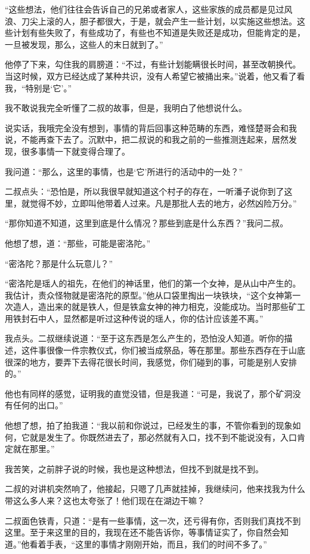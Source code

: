 “这些想法，他们往往会告诉自己的兄弟或者家人，这些家族的成员都是见过风浪、刀尖上滚的人，胆子都很大，于是，就会产生一些计划，以实施这些想法。这些计划有些失败了，有些成功了，有些也不知道是失败还是成功，但能肯定的是，一旦被发现，那么，这些人的末日就到了。”

他停了下来，勾住我的肩膀道：“不过，有些计划能瞒很长时间，甚至改朝换代。当这时候，双方已经达成了某种共识，没有人希望它被捅出来。”说着，他又看了看我，“特别是‘它’。”

我不敢说我完全听懂了二叔的故事，但是，我明白了他想说什么。

说实话，我哦完全没有想到，事情的背后回事这种范畴的东西，难怪楚哥会和我说，不能再查下去了。沉默中，把二叔说的和我之前的一些推测连起来，居然发现，很多事情一下就变得合理了。

我问道：“那么，这里的事情，也是‘它’所进行的活动中的一处？”

二叔点头：“恐怕是，所以我很早就知道这个村子的存在，一听潘子说你到了这里，就觉得不妙，立即叫他带着人过来。凡是那批人去的地方，必然凶险万分。”

“那你知道不知道，这里到底是什么情况？那些到底是什么东西？”我问二叔。

他想了想，道：“那些，可能是密洛陀。”

“密洛陀？那是什么玩意儿？”

“密洛陀是瑶人的祖先，在他们的神话里，他们的第一个女神，是从山中产生的。我估计，责众怪物就是密洛陀的原型。”他从口袋里掏出一块铁块，“这个女神第一次造人，造出来的就是铁人，但是铁盒女神的神力相克，没能成功。当时那些矿工用铁封石中人，显然都是听过这种传说的瑶人，你的估计应该差不离。”

我点头。二叔继续说道：“至于这东西是怎么产生的，恐怕没人知道。听你的描述，这件事很像一件宗教仪式，你们被当成祭品，等在那里。那些东西存在于山底很深的地方，要弄下去得花很长时间，我感觉，你们碰到的事，可能是别人安排的。”

他也有同样的感觉，证明我的直觉没错，但是我道：“可是，我说了，那个矿洞没有任何的出口。”

他想了想，拍了拍我道：“我以前和你说过，已经发生的事，不管你看到的现象如何，它就是发生了。你既然进去了，那必然就有入口，找不到不能说没有，入口肯定就在那里。”

我苦笑，之前胖子说的时候，我也是这种想法，但找不到就是找不到。

二叔的对讲机突然响了，他接起，只嗯了几声就挂掉，我继续问，他来找我为什么带这么多人来？这也太夸张了！他们现在在湖边干嘛？

二叔面色铁青，只道：“是有一些事情，这一次，还亏得有你，否则我们真找不到这里。至于来这里的目的，我现在还不能告诉你，等事情证实了，你自然会知道。”他看着手表，“这里的事情才刚刚开始，而且，我们的时间不多了。”

